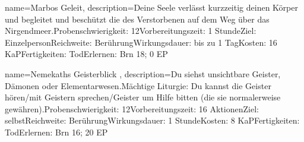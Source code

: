 {
    name={Marbos Geleit},
    description={Deine Seele verlässt kurzzeitig deinen Körper und begleitet und beschützt die des Verstorbenen auf dem Weg über das Nirgendmeer.\newline Probenschwierigkeit: 12\newline Vorbereitungszeit: 1 Stunde\newline Ziel: Einzelperson\newline Reichweite: Berührung\newline Wirkungsdauer: bis zu 1 Tag\newline Kosten: 16 KaP\newline Fertigkeiten: Tod\newline Erlernen: Brn 18; 0 EP}
}


{
    name={Nemekaths Geisterblick },
    description={Du siehst unsichtbare Geister, Dämonen oder Elementarwesen.\newline Mächtige Liturgie: Du kannst die Geister hören/mit Geistern sprechen/Geister um Hilfe bitten (die sie normalerweise gewähren).\newline Probenschwierigkeit: 12\newline Vorbereitungszeit: 16 Aktionen\newline Ziel: selbst\newline Reichweite: Berührung\newline Wirkungsdauer: 1 Stunde\newline Kosten: 8 KaP\newline Fertigkeiten: Tod\newline Erlernen: Brn 16; 20 EP}
}


